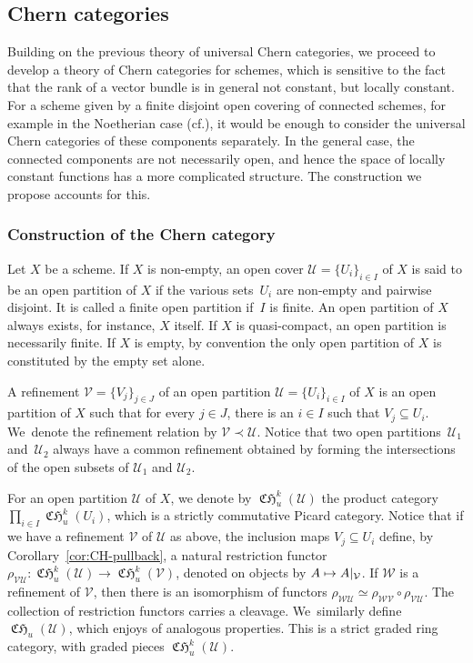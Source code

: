 \documentclass[11pt]{article}
\newcommand{\cf}{cf.\xspace}
\newcommand\mto{\mathchoice{\longmapsto}{\mapsto}{\mapsto}{\mapsto}}
\theoremstyle{plain}
\theoremstyle{definition}
\newcommand{\Ucal}{\mathcal U}
\newcommand{\Vcal}{\mathcal V}
\newcommand{\Wcal}{\mathcal W}
\DeclareMathOperator{\CHfrak}{\mathfrak{CH}}
\begin{document}
\subsection{Chern categories}\label{subsec:Chern-category-quasi-compact}
Building on the previous theory of universal Chern categories, we proceed to develop a theory of Chern categories for schemes, which is sensitive to the fact that the rank of a vector bundle is in general not constant, but locally constant. For a scheme given by a finite disjoint open covering of connected schemes, for example in the Noetherian case (\cf \cite[\href{https://stacks.math.columbia.edu/tag/04MF}{04MF}]{stacks-project}), it would be enough to consider the universal Chern categories of these components separately. In the general case, the connected components are not necessarily open, and hence the space of locally constant functions has a more complicated structure. The construction we propose accounts for this.

\subsubsection{Construction of the Chern category}
Let $X$ be a scheme. If $X$ is non-empty, an open cover $\Ucal=\lbrace U_{i}\rbrace_{i\in I}$ of $X$ is said to be an open partition of $X$ if the various sets~$U_i$ are non-empty and pairwise disjoint. It is called a finite open partition if~$I$ is finite. An open partition of $X$ always exists, for instance, $X$ itself. If $X$ is quasi-compact, an open partition is necessarily finite. If $X$ is empty, by convention the only open partition of $X$ is constituted by the empty set alone.

A refinement $\Vcal=\lbrace V_{j}\rbrace_{j\in J}$ of an open partition $\Ucal=\lbrace U_{i}\rbrace_{i\in I}$ of $X$ is an open partition of $X$ such that for every $j \in J$, there is an $i \in I$ such that $V_j \subseteq U_i$. We~denote the refinement relation by $\Vcal\prec\Ucal$. Notice that two open partitions~$\Ucal_{1}$ and~$\Ucal_{2}$ always have a common refinement obtained by forming the intersections of the open subsets of $\Ucal_{1}$ and $\Ucal_{2}$.

For an open partition $\Ucal$ of $X$, we denote by $\CHfrak_{u}^{k}(\Ucal)$ the product category $\prod_{i\in I}\CHfrak_u^{k}(U_{i})$, which is a strictly commutative Picard category. Notice that if we have a refinement $\Vcal$ of $\Ucal$ as above, the inclusion maps $V_j \subseteq U_i$ define, by Corollary~\ref{cor:CH-pullback}, a natural restriction functor $\rho_{\Vcal\Ucal}\colon \CHfrak_{u}^{k}(\Ucal) \to \CHfrak_{u}^{k}(\Vcal)$, denoted on objects by $A\mto A|_{\Vcal}$. If $\Wcal$ is a refinement of $\Vcal$, then there is an isomorphism of functors $\rho_{\Wcal\Ucal}\simeq\rho_{\Wcal\Vcal}\circ\rho_{\Vcal\Ucal}$. The collection of restriction functors carries a cleavage. We~similarly define $\CHfrak_{u}(\Ucal)$, which enjoys of analogous properties. This is a strict graded ring category, with graded pieces $\CHfrak^{k}_{u}(\Ucal)$.
\end{document}
